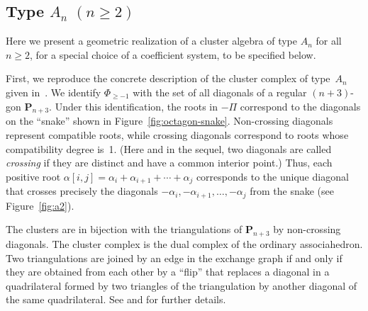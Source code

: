 \documentclass[letterpaper]{amsart}
\numberwithin{equation}{section}
\theoremstyle{definition}
\def\Poly{\mathbf{P}}
\begin{document}
\subsection{Type $A_n \,\, (n \geq 2)$} 
\label{sec:ca-type-A} 
 
 
Here we present a geometric realization of a cluster algebra of type 
$A_n$ for all $n \geq 2$, for a special choice of a coefficient system, 
to be specified below. 
 
First, we reproduce the concrete description of the cluster complex of 
type~$A_n$ given in~\cite[Section~3.5]{yga}. 
We identify $\Phi_{\geq -1}$ with the set of all diagonals of a 
regular $(n+3)$-gon $\Poly_{n+3}$. Under this identification, the 
roots in $- \Pi$ correspond to the diagonals on the ``snake'' 
shown in Figure~\ref{fig:octagon-snake}. 
 Non-crossing diagonals represent compatible roots, while crossing 
diagonals correspond to roots 
whose compatibility degree is~1. 
(Here and in the sequel, two 
diagonals are called \emph{crossing} if they are distinct and have 
a common interior point.) 
Thus, each positive root $\alpha[i,j]= 
\alpha_i + \alpha_{i+1} + \cdots + \alpha_j$ corresponds to the 
unique diagonal that crosses precisely the diagonals $- \alpha_i, 
- \alpha_{i+1}, \ldots,- \alpha_j$ from the snake (see 
Figure~\ref{fig:a2}). 
 
 The clusters are in bijection with the triangulations of 
$\Poly_{n+3}$ by non-crossing diagonals. 
The cluster complex is the dual complex of the ordinary associahedron. 
Two triangulations are joined by an edge in the exchange graph if and 
only if they are obtained from each other by a ``flip'' that replaces 
a diagonal in a quadrilateral formed by two triangles of the 
triangulation by another diagonal of the same quadrilateral. 
See \cite[Section~3.5]{yga} and \cite[Section~4.1]{cfz} for further 
details. 
 
\end{document}
